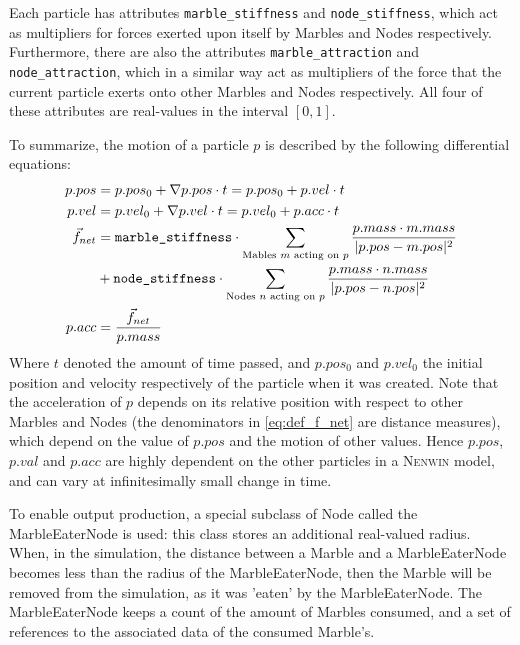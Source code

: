 Each particle has attributes \texttt{marble\_stiffness} and \texttt{node\_stiffness}, which act as multipliers for forces exerted upon itself by Marbles and Nodes respectively. Furthermore, there are also the attributes \texttt{marble\_attraction} and \texttt{node\_attraction}, which in a similar way act as multipliers of the force that the current particle exerts onto other Marbles and Nodes respectively. All four of these attributes are real-values in the interval $[0, 1]$. 

To summarize, the motion of a particle $p$ is described by the following differential equations:
\begin{align}
    p.pos &= p.pos_0 + \nabla p.pos \cdot t  = p.pos_0 + p.vel \cdot t \label{eq:def_pos} \\
    p.vel &= p.vel_0 + \nabla p.vel \cdot t = p.vel_0 + p.acc \cdot t \label{eq:def_vel}\\
    \vec{f}_{net} & = \texttt{marble\_stiffness} \cdot \sum_{\text{Mables $m$ acting on $p$}} \frac{p.mass \cdot m.mass}{\lvert p.pos - m.pos \rvert^2} \nonumber \\
    & + \texttt{node\_stiffness} \cdot \sum_{\text{Nodes $n$ acting on $p$}} \frac{p.mass \cdot n.mass}{\lvert p.pos - n.pos \rvert^2} \label{eq:def_f_net}\\
    p.acc &= \frac{\vec{f}_{net}}{p.mass} \label{eq:def_acc}
\end{align}
Where $t$ denoted the amount of time passed, and $p.pos_0$ and $p.vel_0$ the initial position and velocity respectively of the particle when it was created.
Note that the acceleration of $p$ depends on its relative position with respect to other Marbles and Nodes (the denominators in \eqref{eq:def_f_net} are distance measures), which depend on the value of $p.pos$ and the motion of other values. Hence $p.pos$, $p.val$ and $p.acc$ are highly dependent on the other particles in a \textsc{Nenwin} model, and can vary at infinitesimally small change in time.

To enable output production, a special subclass of Node called the MarbleEaterNode is used: this class stores an additional real-valued radius. When, in the simulation, the distance between a Marble and a MarbleEaterNode becomes less than the radius of the MarbleEaterNode, then the Marble will be removed from the simulation, as it was 'eaten' by the MarbleEaterNode. The MarbleEaterNode keeps a count of the amount of Marbles consumed, and a set of references to the associated data of the consumed Marble's.


